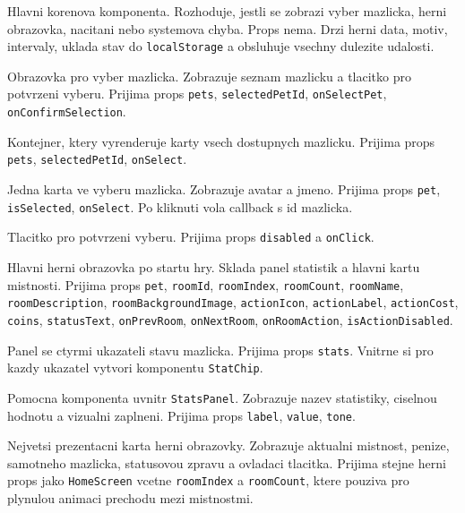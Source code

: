 \documentclass[12pt,a4paper]{article}
\begin{document}
\begin{description}[style=nextline]
  \item[\texttt{App}] Hlavni korenova komponenta. Rozhoduje, jestli se zobrazi vyber mazlicka, herni obrazovka, nacitani nebo systemova chyba. Props nema. Drzi herni data, motiv, intervaly, uklada stav do \texttt{localStorage} a obsluhuje vsechny dulezite udalosti.

  \item[\texttt{PetSelectionScreen}] Obrazovka pro vyber mazlicka. Zobrazuje seznam mazlicku a tlacitko pro potvrzeni vyberu. Prijima props \texttt{pets}, \texttt{selectedPetId}, \texttt{onSelectPet}, \texttt{onConfirmSelection}.

  \item[\texttt{PetSelectionList}] Kontejner, ktery vyrenderuje karty vsech dostupnych mazlicku. Prijima props \texttt{pets}, \texttt{selectedPetId}, \texttt{onSelect}.

  \item[\texttt{PetOptionCard}] Jedna karta ve vyberu mazlicka. Zobrazuje avatar a jmeno. Prijima props \texttt{pet}, \texttt{isSelected}, \texttt{onSelect}. Po kliknuti vola callback s id mazlicka.

  \item[\texttt{SelectPetButton}] Tlacitko pro potvrzeni vyberu. Prijima props \texttt{disabled} a \texttt{onClick}.

  \item[\texttt{HomeScreen}] Hlavni herni obrazovka po startu hry. Sklada panel statistik a hlavni kartu mistnosti. Prijima props \texttt{pet}, \texttt{roomId}, \texttt{roomIndex}, \texttt{roomCount}, \texttt{roomName}, \texttt{roomDescription}, \texttt{roomBackgroundImage}, \texttt{actionIcon}, \texttt{actionLabel}, \texttt{actionCost}, \texttt{coins}, \texttt{statusText}, \texttt{onPrevRoom}, \texttt{onNextRoom}, \texttt{onRoomAction}, \texttt{isActionDisabled}.

  \item[\texttt{StatsPanel}] Panel se ctyrmi ukazateli stavu mazlicka. Prijima props \texttt{stats}. Vnitrne si pro kazdy ukazatel vytvori komponentu \texttt{StatChip}.

  \item[\texttt{StatChip}] Pomocna komponenta uvnitr \texttt{StatsPanel}. Zobrazuje nazev statistiky, ciselnou hodnotu a vizualni zaplneni. Prijima props \texttt{label}, \texttt{value}, \texttt{tone}.

  \item[\texttt{PetCard}] Nejvetsi prezentacni karta herni obrazovky. Zobrazuje aktualni mistnost, penize, samotneho mazlicka, statusovou zpravu a ovladaci tlacitka. Prijima stejne herni props jako \texttt{HomeScreen} vcetne \texttt{roomIndex} a \texttt{roomCount}, ktere pouziva pro plynulou animaci prechodu mezi mistnostmi.


\end{description}
\end{document}
